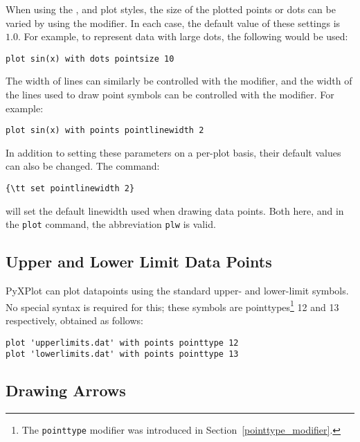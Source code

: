 When using the ,  and  plot
styles, the size of the plotted points or dots can be varied by using the
 modifier. In each case, the default value of these settings
is $1.0$. For example, to represent data with large dots, the following would
be used:

\begin{verbatim}
plot sin(x) with dots pointsize 10
\end{verbatim}

\noindent The width of lines can similarly be controlled with the
 modifier, and the width of the lines used to draw point
symbols can be controlled with the  modifier. For
example:

\begin{verbatim}
plot sin(x) with points pointlinewidth 2
\end{verbatim}

\noindent In addition to setting these parameters on a per-plot basis, their
default values can also be changed. The command:

\begin{verbatim}
{\tt set pointlinewidth 2}
\end{verbatim}

\noindent will set the default linewidth used when drawing data points. Both
here, and in the {\tt plot} command, the abbreviation {\tt plw} is valid. 

\subsection{Upper and Lower Limit Data Points}

PyXPlot can plot datapoints using the standard upper- and lower-limit
symbols. No special
syntax is required for this; these symbols are pointtypes\footnote{The
{\tt pointtype} modifier was introduced in
Section~\ref{pointtype_modifier}.} 12 and 13 respectively, obtained as follows:

\begin{verbatim}
plot 'upperlimits.dat' with points pointtype 12
plot 'lowerlimits.dat' with points pointtype 13
\end{verbatim}

\subsection{Drawing Arrows}
\label{arrows_plot_style} 

